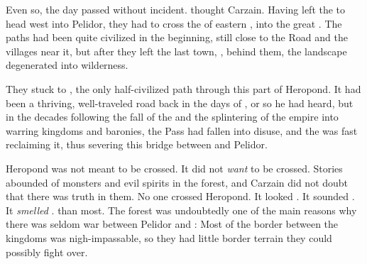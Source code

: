 \begin{comment}
\subsection{Evening}
\end{comment}

\new
Even so, the day passed without incident. 
 thought Carzain. 
Having left the  to head west into Pelidor, they had to cross the \Wylde{} of eastern \Scyrum{}, into the great . 
The paths had been quite civilized in the beginning, still close to the \Pylandos{} Road and the villages near it, 
but after they left the last town, , behind them, the landscape degenerated into wilderness. 

They stuck to , the only half-civilized path through this part of Heropond. It had been a thriving, well-traveled road back in the days of , or so he had heard, but in the decades following the fall of the  and the splintering of the empire into warring kingdoms and baronies, the Pass had fallen into disuse, and the \Wylde{} was fast reclaiming it, thus severing this bridge between \Scyrum{} and Pelidor. 

Heropond was not meant to be crossed. It did not \emph{want} to be crossed. Stories abounded of monsters and evil spirits in the forest, and %
Carzain did not doubt that there was truth in them. No one crossed Heropond. It looked \Wylde{}. It sounded \Wylde{}. It \emph{smelled} \Wylde{}. \Wylder{} than most. The forest was undoubtedly one of the main reasons why there was seldom war between Pelidor and \Scyrum{}: Most of the border between the kingdoms was nigh-impassable, so they had little border terrain they could possibly fight over. 


